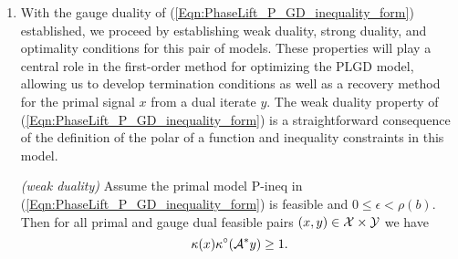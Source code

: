 \begin{enumerate}
\begin{proof}
Taking the polar of $\phi$, we have
\begin{equation}
\begin{array}{rcl}
\phi^\circ(A^*y, y, \tau)
	&	=	&	\max \halfspace \{ \halfspace \kappa^\circ(A^*y), \ \left( \delta_{\epi \halfspace \rho} \right)^\circ(y, \tau) \}	\\
	&	=	&	\max \halfspace \{ \halfspace \kappa^\circ(A^*y), \ \delta_{\left( \epi \halfspace \rho \right)^\circ} (y, \tau) \}	\\
	&	=	&	\kappa^\circ(A^*y) + \delta_{\left( \epi \halfspace \rho \right)^\circ}(y, \tau) \\
	&	=	&	\kappa^\circ(A^*y) + \delta_{\epi \left( \rho^\circ \right)} (y, -\tau).
\end{array}
\end{equation}
The first equality is a result of Proposition \ref{Prop:P-GD-polar_of_sum_of_gauges}. The second and last equalities are results of Proposition \ref{Prop:P-GD-indicator_epigraph_polar}, (i) and (ii), respectively.  And the third equality is a consequence of the indicator function mapping to $\{0, +\infty \}$.  

The indicator function $\delta_{\epi \left( \rho^\circ \right)} (y, -\tau)$ corresponds to the constraint $\rho^\circ(y) \leq - \tau$.  This constraint and the equality constraint $\langle b, y \rangle + \sigma \tau = 1$ may be combined as
\begin{equation*}
\langle b, y \rangle - \sigma \rho^\circ(y) \geq \langle b, y \rangle + \sigma \tau = 1.
\end{equation*}
Thus we eliminate $\tau$ and recover GD-ineq.
\end{proof}



\item

With the gauge duality of (\ref{Eqn:PhaseLift_P_GD_inequality_form}) established, we proceed by establishing weak duality, strong duality, and optimality conditions for this pair of models.  These properties will play a central role in the first-order method for optimizing the PLGD model, allowing us to develop termination conditions as well as a recovery method for the primal signal $x$ from a dual iterate $y$.  The weak duality property of (\ref{Eqn:PhaseLift_P_GD_inequality_form}) is a straightforward consequence of the definition of the polar of a function and inequality constraints in this model.

\begin{prop} \label{Prop:weak_duality}
\emph{(weak duality)}
Assume the primal model P-ineq in (\ref{Eqn:PhaseLift_P_GD_inequality_form}) is feasible and $0 \leq \epsilon < \rho(b)$.  Then for all primal and gauge dual feasible pairs $(x, y) \in {\mathcal X} \times {\mathcal Y}$ we have
\begin{equation}				\label{Eqn:weak_duality}
\kappa(x) \kappa^\circ ( {\mathcal A}^* y ) \geq 1.
\end{equation}


\end{prop}
\end{enumerate}
